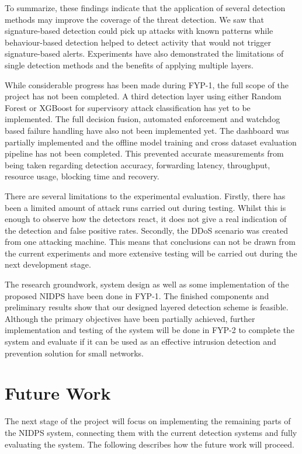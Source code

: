 \noindent To summarize, these findings indicate that the application of several detection methods may improve the coverage of the threat detection. We saw that signature-based detection could pick up attacks with known patterns while behaviour-based detection helped to detect activity that would not trigger signature-based alerts. Experiments have also demonstrated the limitations of single detection methods and the benefits of applying multiple layers.

\noindent While considerable progress has been made during FYP-1, the full scope of the project has not been completed. A third detection layer using either Random Forest or XGBoost for supervisory attack classification has yet to be implemented. The full decision fusion, automated enforcement and watchdog based failure handling have also not been implemented yet. The dashboard was partially implemented and the offline model training and cross dataset evaluation pipeline has not been completed. This prevented accurate measurements from being taken regarding detection accuracy, forwarding latency, throughput, resource usage, blocking time and recovery.

\noindent There are several limitations to the experimental evaluation. Firstly, there has been a limited amount of attack runs carried out during testing. Whilst this is enough to observe how the detectors react, it does not give a real indication of the detection and false positive rates. Secondly, the DDoS scenario was created from one attacking machine. This means that conclusions can not be drawn from the current experiments and more extensive testing will be carried out during the next development stage.

\noindent The research groundwork, system design as well as some implementation of the proposed NIDPS have been done in FYP-1. The finished components and preliminary results show that our designed layered detection scheme is feasible. Although the primary objectives have been partially achieved, further implementation and testing of the system will be done in FYP-2 to complete the system and evaluate if it can be used as an effective intrusion detection and prevention solution for small networks.

\section{Future Work}\label{sec:10.2}

\noindent The next stage of the project will focus on implementing the remaining parts of the NIDPS system, connecting them with the current detection systems and fully evaluating the system. The following describes how the future work will proceed.

